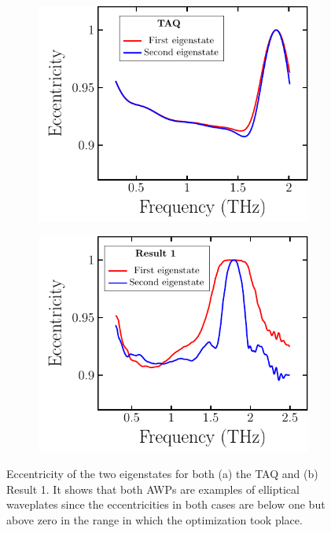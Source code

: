 \begin{figure}[H]
    \begin{subfigure}[b]{.5\linewidth}
    \caption{}\label{}
    \centering\includegraphics[scale=0.75]{images/results/plots/ceramic/eigenstate_eccentricity_a.pdf}
    \end{subfigure}%
    \begin{subfigure}[b]{.5\linewidth}
    \caption{}\label{}
    \centering\includegraphics[scale=0.75]{images/results/plots/ceramic/eigenstate_eccentricity_b.pdf}
    \end{subfigure}
    \caption{Eccentricity of the two eigenstates for both (a) the TAQ and (b) Result 1. It shows that both AWPs are examples of elliptical waveplates since the eccentricities in both cases are below one but above zero in the range in which the optimization took place.}
    \label{fig:cl4_eigenstate_eccentricity}
\end{figure}

